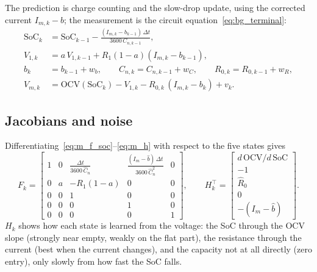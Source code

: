 The prediction is charge counting and the slow-drop update, using the corrected current $I_{m,k} - b$; the measurement is the circuit equation~\eqref{eq:bg_terminal}:
\begin{align}
  \mathrm{SoC}_k &= \mathrm{SoC}_{k-1} - \frac{(I_{m,k} - b_{k-1})\, \Delta t}{3600\, C_{n,k-1}}, \label{eq:m_f_soc}\\
  V_{1,k} &= a\, V_{1,k-1} + R_1 (1 - a)(I_{m,k} - b_{k-1}), \label{eq:m_f_v1}\\
  b_k &= b_{k-1} + w_b, \qquad C_{n,k} = C_{n,k-1} + w_C, \qquad R_{0,k} = R_{0,k-1} + w_R, \label{eq:m_f_r0}\\
  V_{m,k} &= \mathrm{OCV}(\mathrm{SoC}_k) - V_{1,k} - R_{0,k}\,(I_{m,k} - b_k) + v_k . \label{eq:m_h}
\end{align}

\subsection{Jacobians and noise}\label{sec:m_ekf_f}\label{sec:m_ekf_h}\label{sec:m_ekf_q}

Differentiating~\eqref{eq:m_f_soc}--\eqref{eq:m_h} with respect to the five states gives
\begin{equation}
  F_k =
  \begin{bmatrix}
    1 & 0 & \frac{\Delta t}{3600\, \hat{C}_n} & \frac{(I_m - \hat{b})\, \Delta t}{3600\, \hat{C}_n^{2}} & 0 \\[3pt]
    0 & a & -R_1 (1 - a) & 0 & 0 \\
    0 & 0 & 1 & 0 & 0 \\
    0 & 0 & 0 & 1 & 0 \\
    0 & 0 & 0 & 0 & 1
  \end{bmatrix},
  \qquad
  H_k^{\top} =
  \begin{bmatrix} d\,\mathrm{OCV}/d\,\mathrm{SoC} \\ -1 \\ \hat{R}_0 \\ 0 \\ -(I_m - \hat{b}) \end{bmatrix}.
  \label{eq:m_F}
\end{equation}
$H_k$ shows how each state is learned from the voltage: the SoC through the OCV slope (strongly near empty, weakly on the flat part), the resistance through the current (best when the current changes), and the capacity not at all directly (zero entry), only slowly from how fast the SoC falls.


